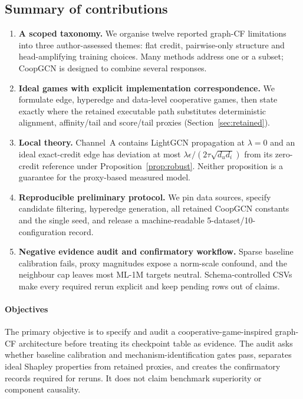 \documentclass[a4paper,fleqn,longmktitle]{cas-dc}
\begin{document}
\subsection{Summary of contributions}
\label{sec:contrib}

\begin{enumerate}
\item \textbf{A scoped taxonomy.} We organise twelve reported graph-CF
limitations into three author-assessed themes: flat credit, pairwise-only
structure and head-amplifying training choices. Many methods address one or a
subset; CoopGCN is designed to combine several responses.

\item \textbf{Ideal games with explicit implementation correspondence.} We
formulate edge, hyperedge and data-level cooperative games, then state exactly
where the retained executable path substitutes deterministic alignment,
affinity/tail and score/tail proxies (Section~\ref{sec:retained}).

\item \textbf{Local theory.} Channel~A contains LightGCN propagation at
$\lambda=0$ and an ideal exact-credit edge has deviation at most
$\lambda\epsilon/(2\tau\sqrt{d_ud_i})$ from its zero-credit reference under
Proposition~\ref{prop:robust}. Neither proposition is a guarantee for the
proxy-based measured model.

\item \textbf{Reproducible preliminary protocol.} We pin data sources, specify
candidate filtering, hyperedge generation, all retained CoopGCN constants and
the single seed, and release a machine-readable 5-dataset/10-configuration
record.

\item \textbf{Negative evidence audit and confirmatory workflow.} Sparse
baseline calibration fails, proxy magnitudes expose a norm-scale confound, and
the neighbour cap leaves most ML-1M targets neutral. Schema-controlled CSVs
make every required rerun explicit and keep pending rows out of claims.
\end{enumerate}

\paragraph{Objectives}
The primary objective is to specify and audit a cooperative-game-inspired
graph-CF architecture before treating its checkpoint table as evidence. The
audit asks whether baseline calibration and mechanism-identification gates
pass, separates ideal Shapley properties from retained proxies, and creates the
confirmatory records required for reruns. It does not claim benchmark
superiority or component causality.
\end{document}
